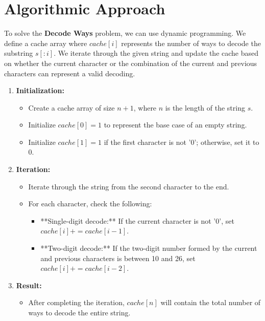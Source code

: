 \section*{Algorithmic Approach}

To solve the \textbf{Decode Ways} problem, we can use dynamic programming. We define a cache array where \( cache[i] \) represents the number of ways to decode the substring \( s[:i] \). We iterate through the given string and update the cache based on whether the current character or the combination of the current and previous characters can represent a valid decoding.

\begin{enumerate}
    \item \textbf{Initialization:}
    \begin{itemize}
        \item Create a cache array of size \( n + 1 \), where \( n \) is the length of the string \( s \).
        \item Initialize \( cache[0] = 1 \) to represent the base case of an empty string.
        \item Initialize \( cache[1] = 1 \) if the first character is not '0'; otherwise, set it to 0.
    \end{itemize}
    
    \item \textbf{Iteration:}
    \begin{itemize}
        \item Iterate through the string from the second character to the end.
        \item For each character, check the following:
        \begin{itemize}
            \item **Single-digit decode:** If the current character is not '0', set \( cache[i] += cache[i-1] \).
            \item **Two-digit decode:** If the two-digit number formed by the current and previous characters is between 10 and 26, set \( cache[i] += cache[i-2] \).
        \end{itemize}
    \end{itemize}
    
    \item \textbf{Result:}
    \begin{itemize}
        \item After completing the iteration, \( cache[n] \) will contain the total number of ways to decode the entire string.
    \end{itemize}
\end{enumerate}

